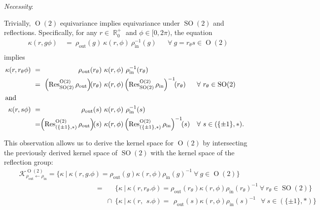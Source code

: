 \documentclass{article}
\newcommand{\lp}{\left(}
\newcommand{\rp}{\right)}
\DeclareMathOperator*{\R}{\mathbb{R}}
\renewcommand{\O}[1]{\ensuremath{\operatorname{O}(#1)}}
\newcommand{\SO}[1]{\ensuremath{\operatorname{SO}(#1)}}
\newcommand{\Flip}{(\{\pm 1\}, *)}
\newcommand{\Res}[2]{\ensuremath{\operatorname{Res}_{#1}^{#2}}}
\begin{document}
\textit{Necessity}:
\begin{addmargin}[2em]{0em}
	Trivially, $\O2$ equivariance implies equivariance under $\SO2$ and reflections.
	Specifically, for any $r \in {\R}^+_0$ and $\phi \in [0, 2\pi)$, the equation
	\begin{align*}
	\kappa(r, g \phi) &\ =\ \rho_\text{out}(g)\ \kappa(r, \phi)\ \rho_\text{in}^{-1}(g) && \forall\ g = r_\theta s \in \O{2} \\
	\end{align*}
	implies
	\begin{align*}
		\kappa(r, r_{\theta} \phi)
		&\ =& \rho_\text{out}(r_\theta)\                          &\kappa(r, \phi)\ \rho_\text{in}^{-1}(r_\theta) \\
		&\ =& \hspace*{-1em}
		     \lp\Res{\SO2}{\O2}\rho_\text{out}\rp\!\!(r_\theta)\ &\kappa(r, \phi)  \lp\Res{\SO2}{\O2}\rho_\text{in}\rp^{-1}\!\!(r_\theta) && \forall\ r_\theta \in \SO{2}\phantom{.} \\
	\intertext{and}
		\kappa(r, s \phi)
		&\ =& \phantom{_\theta}\rho_\text{out}(s)\                &\kappa(r, \phi)\ \rho_\text{in}^{-1}(s) \\
		&\ =& \hspace*{-1em}
			\lp\Res{\Flip}{\O2}\rho_\text{out}\rp\!\!(s)\         &\kappa(r, \phi)  \lp\Res{\Flip}{\O2}\rho_\text{in}\rp^{-1}\!\!(s) && \forall\ s \in \Flip.
\end{align*}
\end{addmargin}

This observation allows us to derive the kernel space for $\O2$ by intersecting the previously derived kernel space of $\SO2$ with the kernel space of the reflection group:
\begin{align*}
&\quad\mathcal{K}^{\O2}_{\rho_\text{out}\leftarrow\rho_\text{in}} =
	\big\{\kappa\ |\ \kappa(r, g.\phi) = \rho_\text{out}(g) \kappa(r, \phi) \rho_\text{in}(g)^{-1}\ \forall\ g \in \O2 \big\} &&\\
	& \qquad\qquad\qquad\qquad\qquad\qquad          = \ \phantom{\cap}\ \big\{\kappa\ |\ \kappa(r, r_{\theta}.\phi) = \rho_\text{out}(r_{\theta}) \kappa(r, \phi) \rho_\text{in}(r_{\theta})^{-1}\ \forall\ r_{\theta} \in \SO2 \big\} &&\\
	& \qquad\qquad\qquad\qquad\qquad\qquad \phantom{=}\          \cap \ \big\{\kappa\ |\ \kappa(r, \phantom{_{\theta}}s.\phi) = \phantom{_{\theta}}\rho_\text{out}(s)\kappa(r, \phi)\rho_\text{in}(s)^{-1}\phantom{_{\theta}}\,\,\forall\ s \in \Flip \big\} &&
\end{align*}
\end{document}
